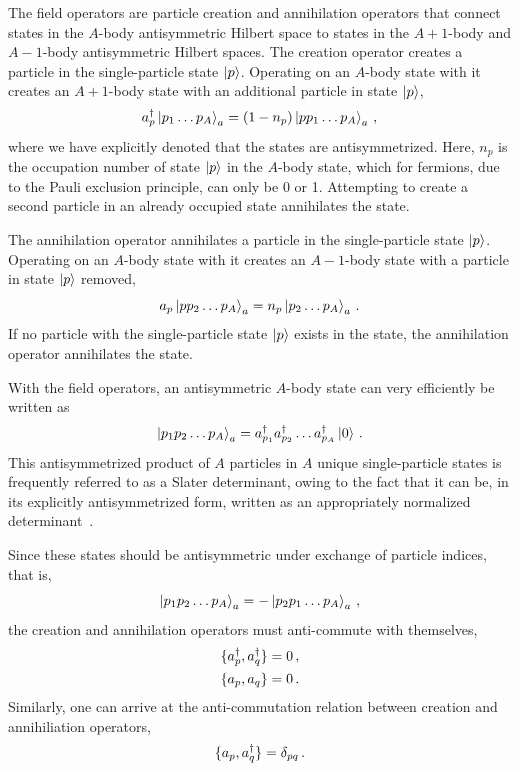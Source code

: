 The field operators are particle creation and annihilation operators
that connect states in the $A$-body antisymmetric Hilbert space
to states in the $A+1$-body and $A-1$-body antisymmetric Hilbert spaces.
The creation operator  creates a particle in the single-particle state $\ket{p}$.
Operating on an $A$-body state with it creates an $A+1$-body state
with an additional particle in state $\ket{p}$,
\begin{equation}
  a_{p}^{\dagger} \ket{p_1 \ldots p_{A}}_a = (1 - n_{p}) \ket{p p_1 \ldots p_{A}}_a\,,
\end{equation}
where we have explicitly denoted that the states are antisymmetrized.
Here, $n_p$ is the occupation number of state $\ket{p}$ in the $A$-body state,
which for fermions, due to the Pauli exclusion principle, can only be 0 or 1.
Attempting to create a second particle in an already occupied state annihilates the state.

The annihilation operator  annihilates a particle in the single-particle state $\ket{p}$.
Operating on an $A$-body state with it creates an $A-1$-body state
with a particle in state $\ket{p}$ removed,
\begin{equation}
  a_{p} \ket{p p_2 \ldots p_A}_a = n_p \ket{p_2 \ldots p_A}_a\,.
\end{equation}
If no particle with the single-particle state $\ket{p}$ exists in the state,
the annihilation operator annihilates the state.

With the field operators, an antisymmetric $A$-body state can very efficiently be written as
\begin{equation}
  \ket{p_1 p_2 \ldots p_A}_a = a_{p_1}^{\dagger} a_{p_2}^{\dagger} \ldots a_{p_A}^{\dagger} \ket{0}\,.
\end{equation}
This antisymmetrized product of $A$ particles in $A$ unique single-particle states
is frequently referred to as a Slater determinant,
owing to the fact that it can be, in its explicitly antisymmetrized form,
written as an appropriately normalized determinant~\cite{Slat29sladet}.

Since these states should be antisymmetric under exchange of particle indices, that is,
\begin{equation}
  \ket{p_1 p_2 \ldots p_A}_a = - \ket{p_2 p_1 \ldots p_A}_a\,,
\end{equation}
the creation and annihilation operators must anti-commute with themselves,
\begin{align}
  \{a_{p}^{\dagger}, a_{q}^{\dagger}\} = 0\,,\\
  \{a_{p}, a_{q}\} = 0\,.
\end{align}
Similarly, one can arrive at the anti-commutation relation
between creation and annihiliation operators,
\begin{equation}
  \{a_{p}, a_{q}^{\dagger}\} = \delta_{pq}\,.
\end{equation}

